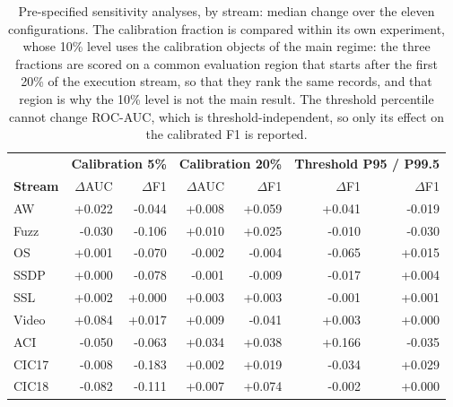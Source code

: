 \begin{table}[ht]\centering\footnotesize\setlength{\tabcolsep}{3.5pt}
\begin{tabular}{l rr rr rr}
\hline
 & \multicolumn{2}{c}{\textbf{Calibration 5\%}} & \multicolumn{2}{c}{\textbf{Calibration 20\%}} & \multicolumn{2}{c}{\textbf{Threshold P95 / P99.5}}\\
\textbf{Stream} & $\Delta$AUC & $\Delta$F1 & $\Delta$AUC & $\Delta$F1 & $\Delta$F1 & $\Delta$F1\\
\hline
AW & +0.022 & -0.044 & +0.008 & +0.059 & +0.041 & -0.019\\
Fuzz & -0.030 & -0.106 & +0.010 & +0.025 & -0.010 & -0.030\\
OS & +0.001 & -0.070 & -0.002 & -0.004 & -0.065 & +0.015\\
SSDP & +0.000 & -0.078 & -0.001 & -0.009 & -0.017 & +0.004\\
SSL & +0.002 & +0.000 & +0.003 & +0.003 & -0.001 & +0.001\\
Video & +0.084 & +0.017 & +0.009 & -0.041 & +0.003 & +0.000\\
ACI & -0.050 & -0.063 & +0.034 & +0.038 & +0.166 & -0.035\\
CIC17 & -0.008 & -0.183 & +0.002 & +0.019 & -0.034 & +0.029\\
CIC18 & -0.082 & -0.111 & +0.007 & +0.074 & -0.002 & +0.000\\
\hline
\end{tabular}
\caption{Pre-specified sensitivity analyses, by stream: median change over the eleven configurations. The calibration fraction is compared within its own experiment, whose 10\% level uses the calibration objects of the main regime: the three fractions are scored on a common evaluation region that starts after the first 20\% of the execution stream, so that they rank the same records, and that region is why the 10\% level is not the main result. The threshold percentile cannot change ROC-AUC, which is threshold-independent, so only its effect on the calibrated F1 is reported.}\label{tab:s_sens}
\end{table}


